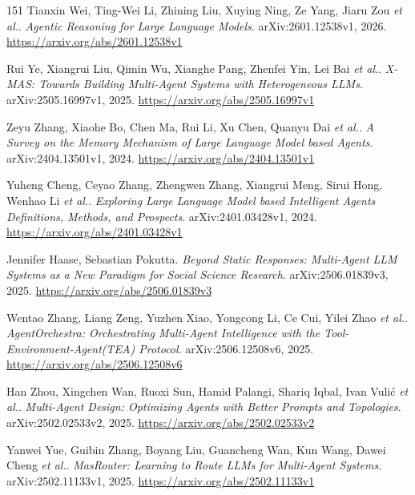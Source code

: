 \documentclass[11pt,a4paper]{article}
\begin{document}
\begin{thebibliography}{151}
Tianxin Wei, Ting-Wei Li, Zhining Liu, Xuying Ning, Ze Yang, Jiaru Zou \emph{et al.}.
\newblock \emph{Agentic Reasoning for Large Language Models}.
\newblock arXiv:2601.12538v1, 2026.
\newblock \url{https://arxiv.org/abs/2601.12538v1}

Rui Ye, Xiangrui Liu, Qimin Wu, Xianghe Pang, Zhenfei Yin, Lei Bai \emph{et al.}.
\newblock \emph{X-MAS: Towards Building Multi-Agent Systems with Heterogeneous LLMs}.
\newblock arXiv:2505.16997v1, 2025.
\newblock \url{https://arxiv.org/abs/2505.16997v1}

Zeyu Zhang, Xiaohe Bo, Chen Ma, Rui Li, Xu Chen, Quanyu Dai \emph{et al.}.
\newblock \emph{A Survey on the Memory Mechanism of Large Language Model based Agents}.
\newblock arXiv:2404.13501v1, 2024.
\newblock \url{https://arxiv.org/abs/2404.13501v1}

Yuheng Cheng, Ceyao Zhang, Zhengwen Zhang, Xiangrui Meng, Sirui Hong, Wenhao Li \emph{et al.}.
\newblock \emph{Exploring Large Language Model based Intelligent Agents Definitions, Methods, and Prospects}.
\newblock arXiv:2401.03428v1, 2024.
\newblock \url{https://arxiv.org/abs/2401.03428v1}

Jennifer Haase, Sebastian Pokutta.
\newblock \emph{Beyond Static Responses: Multi-Agent LLM Systems as a New Paradigm for Social Science Research}.
\newblock arXiv:2506.01839v3, 2025.
\newblock \url{https://arxiv.org/abs/2506.01839v3}

Wentao Zhang, Liang Zeng, Yuzhen Xiao, Yongcong Li, Ce Cui, Yilei Zhao \emph{et al.}.
\newblock \emph{AgentOrchestra: Orchestrating Multi-Agent Intelligence with the Tool-Environment-Agent(TEA) Protocol}.
\newblock arXiv:2506.12508v6, 2025.
\newblock \url{https://arxiv.org/abs/2506.12508v6}

Han Zhou, Xingchen Wan, Ruoxi Sun, Hamid Palangi, Shariq Iqbal, Ivan Vuli\'{c} \emph{et al.}.
\newblock \emph{Multi-Agent Design: Optimizing Agents with Better Prompts and Topologies}.
\newblock arXiv:2502.02533v2, 2025.
\newblock \url{https://arxiv.org/abs/2502.02533v2}

Yanwei Yue, Guibin Zhang, Boyang Liu, Guancheng Wan, Kun Wang, Dawei Cheng \emph{et al.}.
\newblock \emph{MasRouter: Learning to Route LLMs for Multi-Agent Systems}.
\newblock arXiv:2502.11133v1, 2025.
\newblock \url{https://arxiv.org/abs/2502.11133v1}


\end{thebibliography}
\end{document}
